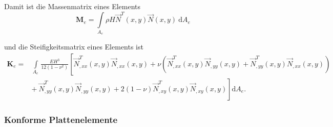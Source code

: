 \documentclass[a4paper,10pt,twoside]{article}
\numberwithin{equation}{section} %
\numberwithin{figure}{section}   %
\numberwithin{table}{section}    %
\begin{document}
	Damit ist die Massenmatrix eines Elements	
	\begin{equation}\label{equ:platten-Me-matrix}
	\mathbf{M}_{e} = \underset{A_{e} \ }{\int} \rho H \vec{N}^{T}(x,y) \vec{N}(x,y) \ \mathrm{d}A_{e}
	\end{equation}
	
	und die Steifigkeitsmatrix eines Elements ist
	\begin{equation}\label{equ:platten-Ke-matrix}
	\begin{split}
	\mathbf{K}_{e} = & \underset{A_{e} \ }{\int} \frac{EH^{3}}{12(1-\nu^{2})} \left[ \vec{N}_{,xx}^{T}(x,y)\vec{N}_{,xx}(x,y) + \nu\left( \vec{N}_{,xx}^{T}(x,y)\vec{N}_{,yy}(x,y)+\vec{N}_{,yy}^{T}(x,y)\vec{N}_{,xx}(x,y)\right) \right. \\
	& \left.  + \ \vec{N}_{,yy}^{T}(x,y)\vec{N}_{,yy}(x,y) +2(1-\nu)\vec{N}_{,xy}^{T}(x,y)\vec{N}_{,xy}(x,y) \right] \mathrm{d}A_{e}.
	\end{split}
	\end{equation}
	
	\subsubsection{Konforme Plattenelemente} \label{sec:platten-konforme-element}
	
\end{document}
